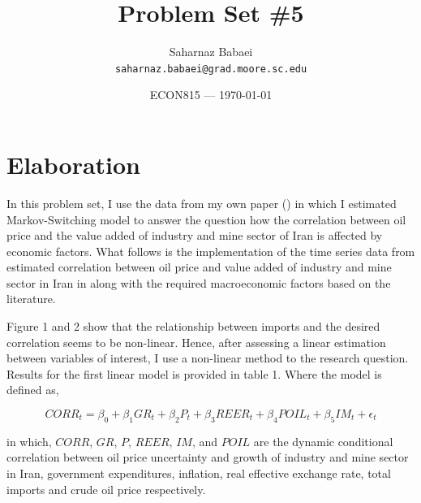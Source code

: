 \documentclass{article}
\title{Problem Set \#5} %
\author{Saharnaz Babaei\\ \texttt{saharnaz.babaei@grad.moore.sc.edu}} %
\date{ECON815 --- \today} %
\begin{document}
\maketitle %


\section*{Elaboration} %

In this problem set, I use the data from my own paper (\cite{heydari2016effects}) in which I estimated Markov-Switching model to answer the question how the correlation between oil price and the value added of industry and mine sector of Iran is affected by economic factors. What follows is the implementation of the time series data from estimated correlation between oil price and value added of industry and mine sector in Iran in \cite{heidari2013theeffect} along with the required macroeconomic factors based on the literature.

Figure 1 and 2 show that the relationship between imports and the desired correlation seems to be non-linear. Hence, after assessing a linear estimation between variables of interest, I use a non-linear method to the research question. Results for the first linear model is provided in table 1. Where the model is defined as,

\begin{equation}
CORR_t = \beta_0 + \beta_1 GR_t + \beta_2 P_t + \beta_3 REER_t + \beta_4 POIL_t + \beta_5 IM_t + \epsilon_t
\end{equation}

in which, $CORR$, $GR$, $P$, $REER$, $IM$, and $POIL$ are the dynamic conditional correlation between oil price uncertainty and growth of industry and mine sector in Iran, government expenditures, inflation, real effective exchange rate, total imports and crude oil price respectively.  
\end{document}
